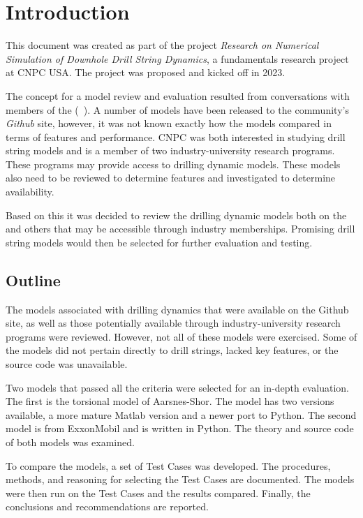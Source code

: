\chapter{Introduction}
This document was created as part of the project \emph{Research on Numerical Simulation of Downhole Drill String Dynamics}, a fundamentals research project at CNPC USA.  The project was proposed and kicked off in 2023.

The concept for a model review and evaluation resulted from conversations with members of the \osdc{} (~\cite{ref:pastusek2019a}).  A number of models have been released to the community's \emph{Github} site, however, it was not known exactly how the models compared in terms of features and performance.  CNPC was both interested in studying drill string models and is a member of two industry-university research programs.  These programs may provide access to drilling dynamic models.  These models also need to be reviewed to determine features and investigated to determine availability.

Based on this it was decided to review the drilling dynamic models both on the \osdc{} and others that may be accessible through industry memberships.  Promising drill string models would then be selected for further evaluation and testing.

\section{Outline}
The models associated with drilling dynamics that were available on the \osdc{} Github site, as well as those potentially available through industry-university research programs were reviewed.  However, not all of these models were exercised.  Some of the models did not pertain directly to drill strings, lacked key features, or the source code was unavailable.

Two models that passed all the criteria were selected for an in-depth evaluation.  The first is the torsional model of Aarsnes-Shor.  The model has two versions available, a more mature Matlab version and a newer port to Python.  The second model is from ExxonMobil and is written in Python.  The theory and source code of both models was examined.

To compare the models, a set of Test Cases was developed.  The procedures, methods, and reasoning for selecting the Test Cases are documented.  The models were then run on the Test Cases and the results compared.  Finally, the conclusions and recommendations are reported.

